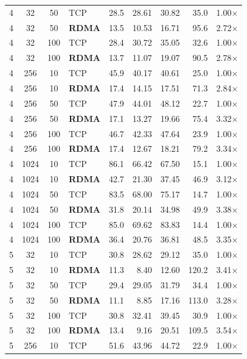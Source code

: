 \documentclass[11pt,a4paper]{article}
\begin{document}
{\begin{longtable}{@{}ccclrrrrr@{}}
4 & 32 & 50 & TCP & 28.5 & 28.61 & 30.82 & 35.0 & 1.00$\times$ \\
4 & 32 & 50 & \textbf{RDMA} & 13.5 & 10.53 & 16.71 & 95.6 & 2.72$\times$ \\
4 & 32 & 100 & TCP & 28.4 & 30.72 & 35.05 & 32.6 & 1.00$\times$ \\
4 & 32 & 100 & \textbf{RDMA} & 13.7 & 11.07 & 19.07 & 90.5 & 2.78$\times$ \\
\midrule
4 & 256 & 10 & TCP & 45.9 & 40.17 & 40.61 & 25.0 & 1.00$\times$ \\
4 & 256 & 10 & \textbf{RDMA} & 17.4 & 14.15 & 17.51 & 71.3 & 2.84$\times$ \\
4 & 256 & 50 & TCP & 47.9 & 44.01 & 48.12 & 22.7 & 1.00$\times$ \\
4 & 256 & 50 & \textbf{RDMA} & 17.1 & 13.27 & 19.66 & 75.4 & 3.32$\times$ \\
4 & 256 & 100 & TCP & 46.7 & 42.33 & 47.64 & 23.9 & 1.00$\times$ \\
4 & 256 & 100 & \textbf{RDMA} & 17.4 & 12.67 & 18.21 & 79.2 & 3.34$\times$ \\
\midrule
4 & 1024 & 10 & TCP & 86.1 & 66.42 & 67.50 & 15.1 & 1.00$\times$ \\
4 & 1024 & 10 & \textbf{RDMA} & 42.7 & 21.30 & 37.45 & 46.9 & 3.12$\times$ \\
4 & 1024 & 50 & TCP & 83.5 & 68.00 & 75.17 & 14.7 & 1.00$\times$ \\
4 & 1024 & 50 & \textbf{RDMA} & 31.8 & 20.14 & 34.98 & 49.9 & 3.38$\times$ \\
4 & 1024 & 100 & TCP & 85.0 & 69.62 & 83.83 & 14.4 & 1.00$\times$ \\
4 & 1024 & 100 & \textbf{RDMA} & 36.4 & 20.76 & 36.81 & 48.5 & 3.35$\times$ \\
\midrule
5 & 32 & 10 & TCP & 30.8 & 28.62 & 29.12 & 35.0 & 1.00$\times$ \\
5 & 32 & 10 & \textbf{RDMA} & 11.3 & 8.40 & 12.60 & 120.2 & 3.41$\times$ \\
5 & 32 & 50 & TCP & 29.4 & 29.05 & 31.79 & 34.4 & 1.00$\times$ \\
5 & 32 & 50 & \textbf{RDMA} & 11.1 & 8.85 & 17.16 & 113.0 & 3.28$\times$ \\
5 & 32 & 100 & TCP & 30.8 & 32.41 & 39.45 & 30.9 & 1.00$\times$ \\
5 & 32 & 100 & \textbf{RDMA} & 13.4 & 9.16 & 20.51 & 109.5 & 3.54$\times$ \\
\midrule
5 & 256 & 10 & TCP & 51.6 & 43.96 & 44.72 & 22.9 & 1.00$\times$ \\

\end{longtable}}
\end{document}
